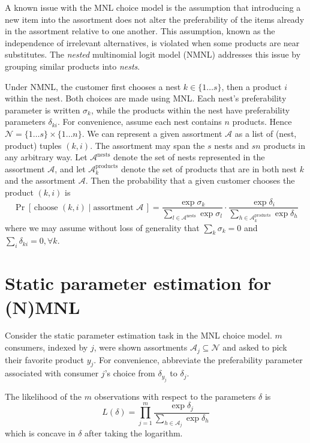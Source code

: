 \documentclass[preprint,12pt,authoryear]{elsarticle}
\begin{document}
A known issue with the MNL choice model is the assumption that introducing a new item into the assortment does not alter the preferability of the items already in the assortment relative to one another. This assumption, known as the independence of irrelevant alternatives, is violated when some products are near substitutes. The \emph{nested} multinomial logit model (NMNL) addresses this issue by grouping similar products into \emph{nests}. 

Under NMNL, the customer first chooses a nest $k \in \{ 1 \dots s\}$, then a product $i$ within the nest. Both choices are made using MNL. Each nest's preferability parameter is written $\sigma_k$, while the products within the nest have preferability parameters $\delta_{ki}$. For convenience, assume each nest contains $n$ products. Hence $\mathcal{N} = \{1\dots s\} \times \{1\dots n\}$. We can represent a given assortment $\mathcal{A}$ as a list of (nest, product) tuples $(k, i)$. The assortment may span the $s$ nests and $sn$ products in any arbitrary way. Let $\mathcal{A}^{\text{nests}}$ denote the set of nests represented in the assortment $\mathcal{A}$, and let $\mathcal{A}_k^{\text{products}}$ denote the set of products that are in both nest $k$ and the assortment $\mathcal{A}$. Then the probability that a given customer chooses the product $(k, i)$ is
\begin{equation}\label{nmnlchoiceprobability}
\operatorname{Pr}\left[\,\text{choose } (k, i) \;|\;\text{assortment }\mathcal{A}\,\right] =\frac{\exp \sigma_k}{\sum_{l\in \mathcal{A}^{\text{nests}}} \exp \sigma_l} \cdot \frac{\exp \delta_i}{\sum_{h\in\mathcal{A}_{k}^{\text{products}}} \exp \delta_h}\end{equation}
where we may assume without loss of generality that $\sum_k \sigma_k = 0$ and $\sum_i \delta_{ki} = 0, \forall k$. 

\section{Static parameter estimation for (N)MNL}
Consider the static parameter estimation task in the MNL choice model. $m$ consumers, indexed by $j$, were shown assortments $\mathcal{A}_j \subseteq \mathcal{N}$ and asked to pick their favorite product $y_j$. For convenience, abbreviate the preferability parameter associated with consumer $j$'s choice from $\delta_{y_j}$ to $\delta_j$. 

The likelihood of the $m$ observations with respect to the parameters $\delta$ is
\begin{equation}
L(\delta) = \prod_{j=1}^m \frac{\exp \delta_j}{\sum_{h\in \mathcal{A}_j} \exp \delta_h}
\end{equation}
which is concave in $\delta$ after taking the logarithm. 
\end{document}
